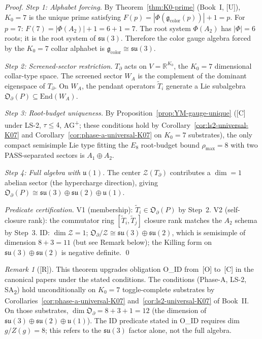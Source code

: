 \documentclass[12pt,oneside]{amsbook}
\theoremstyle{plain}
\theoremstyle{definition}
\theoremstyle{remark}
\newtheorem{remark}[theorem]{Remark}
\newcommand{\status}[1]{\textup{[#1]}}
\begin{document}
\begin{proof}
\textit{Step 1: Alphabet forcing.}
By Theorem~\ref{thm:K0-prime} (Book~I, [U]), $K_0 = 7$ is the unique
prime satisfying $F(p) = |\Phi(\mathfrak{g}_{\mathrm{color}}(p))| + 1
= p$.  For $p = 7$: $F(7) = |\Phi(A_2)| + 1 = 6 + 1 = 7$. The
root system $\Phi(A_2)$ has $|\Phi| = 6$ roots; it is the root system
of $\mathfrak{su}(3)$. Therefore the color gauge algebra forced by
the $K_0 = 7$ collar alphabet is $\mathfrak{g}_{\mathrm{color}}
\cong \mathfrak{su}(3)$.

\textit{Step 2: Screened-sector restriction.}
$T_\partial$ acts on $V = \mathbb{R}^{K_0}$, the $K_0=7$ dimensional
collar-type space. The screened sector $W_A$ is the complement of
the dominant eigenspace of $T_\partial$. On $W_A$, the pendant
operators $\tilde{T}_i$ generate a Lie subalgebra
$\mathfrak{O}_\partial(P) \subseteq \mathrm{End}(W_A)$.

\textit{Step 3: Root-budget uniqueness.}
By Proposition~\ref{prop:YM-gauge-unique} ([C] under LS-2, $\tau \leq 4$,
AG\textsuperscript{+}; these conditions hold by
Corollary~\ref{cor:ls2-universal-K07} and
Corollary~\ref{cor:phase-a-universal-K07} on $K_0=7$ substrates),
the only compact semisimple Lie type fitting the $E_8$ root-budget
bound $\rho_{\max} = 8$ with two PASS-separated sectors is
$A_1 \oplus A_2$.

\textit{Step 4: Full algebra with $\mathfrak{u}(1)$.}
The center $\mathcal{Z}(T_\partial)$ contributes a
$\dim = 1$ abelian sector (the hypercharge direction), giving
$\mathfrak{O}_\partial(P) \cong
\mathfrak{su}(3) \oplus \mathfrak{su}(2) \oplus \mathfrak{u}(1)$.

\textit{Predicate certification.}
V1 (membership): $\tilde{T}_i \in \mathfrak{O}_\partial(P)$ by Step~2.
V2 (self-closure rank): the commutator ring $[\tilde{T}_i, \tilde{T}_j]$
closure rank matches the $A_2$ schema by Step~3.
ID: $\dim\mathcal{Z} = 1$; $\mathfrak{O}_\partial/\mathcal{Z} \cong
\mathfrak{su}(3) \oplus \mathfrak{su}(2)$, which is semisimple of
dimension $8 + 3 = 11$ (but see Remark below); the Killing form on
$\mathfrak{su}(3) \oplus \mathfrak{su}(2)$ is negative definite.
\qed
\end{proof}

\begin{remark}[\status{R}]
This theorem upgrades obligation O\_ID from~[O] to~[C] in the
canonical papers under the stated conditions. The conditions
(Phase-A, LS-2, SA\textsubscript{2}) hold unconditionally on
$K_0=7$ toggle-complete substrates by
Corollaries~\ref{cor:phase-a-universal-K07}
and~\ref{cor:ls2-universal-K07} of Book~II. On those substrates,
$\dim\mathfrak{O}_\partial = 8 + 3 + 1 = 12$ (the dimension of
$\mathfrak{su}(3)\oplus\mathfrak{su}(2)\oplus\mathfrak{u}(1)$).
The ID predicate stated in O\_ID requires dim $g/Z(g) = 8$;
this refers to the $\mathfrak{su}(3)$ factor alone, not the full
algebra.
\end{remark}
\end{document}
